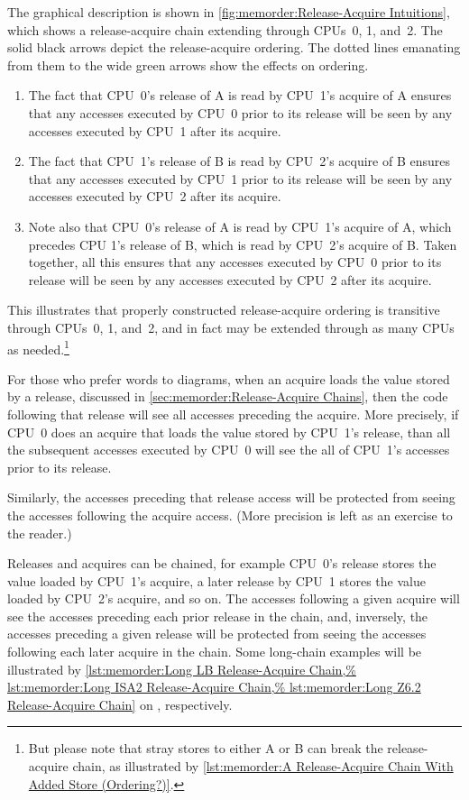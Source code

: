 The graphical description is shown in
\cref{fig:memorder:Release-Acquire Intuitions},
which shows a release-acquire chain extending through CPUs~0, 1, and~2.
The solid black arrows depict the release-acquire ordering.
The dotted lines emanating from them to the wide green arrows show the
effects on ordering.

\begin{enumerate}
\item	The fact that CPU~0's release of A is read by CPU~1's acquire of A
	ensures that any accesses executed by CPU~0 prior to its release
	will be seen by any accesses executed by CPU~1 after its acquire.
\item	The fact that CPU~1's release of B is read by CPU~2's acquire of B
	ensures that any accesses executed by CPU~1 prior to its release
	will be seen by any accesses executed by CPU~2 after its acquire.
\item	Note also that CPU~0's release of A is read by CPU~1's acquire of
	A, which precedes CPU 1's release of B, which is read by CPU~2's
	acquire of B\@.
	Taken together, all this ensures that any accesses executed by
	CPU~0 prior to its release will be seen by any accesses executed
	by CPU~2 after its acquire.
\end{enumerate}

This illustrates that properly constructed release-acquire ordering is
transitive through CPUs~0, 1, and~2, and in fact may be extended through
as many CPUs as needed.\footnote{
	But please note that stray stores to either A or B can break
	the release-acquire chain, as illustrated by
	\cref{lst:memorder:A Release-Acquire Chain With Added Store (Ordering?)}.}

For those who prefer words to diagrams, when an acquire loads the value
stored by a release, discussed in
\cref{sec:memorder:Release-Acquire Chains},
then the code following that release will see all accesses preceding
the acquire.
More precisely, if CPU~0 does an acquire that loads the value stored by
CPU~1's release, than all the subsequent accesses executed by CPU~0 will
see the all of CPU~1's accesses prior to its release.

Similarly, the accesses preceding that release access will be protected
from seeing the accesses following the acquire access.
(More precision is left as an exercise to the reader.)

Releases and acquires can be chained, for example CPU~0's release
stores the value loaded by CPU~1's acquire, a later release by CPU~1
stores the value loaded by CPU~2's acquire, and so on.
The accesses following a given acquire will see the accesses preceding
each prior release in the chain, and, inversely, the accesses preceding a
given release will be protected from seeing the accesses following each
later acquire in the chain.
Some long-chain examples will be illustrated by
\cref{lst:memorder:Long LB Release-Acquire Chain,%
lst:memorder:Long ISA2 Release-Acquire Chain,%
lst:memorder:Long Z6.2 Release-Acquire Chain}
on
,
respectively.

